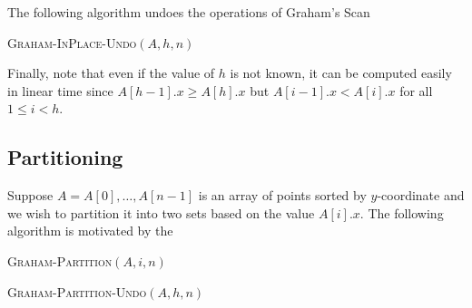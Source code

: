 \documentclass{patmorin}
\begin{document}
The following algorithm undoes the operations of Graham's Scan

\vspace{1ex}
\noindent\begin{minipage}{\textwidth}
\textsc{Graham-InPlace-Undo}$(A, h, n)$
\begin{algorithmic}[1]
  \ENDWHILE
\ENDFOR
\end{algorithmic}
\end{minipage}
\vspace{1ex}
 
Finally, note that even if the value of $h$ is not known, it can be
computed easily in linear time since $A[h-1].x \ge A[h].x$ but
$A[i-1].x<A[i].x$ for all $1\le i< h$.

\subsection{Partitioning}

Suppose $A=A[0],\ldots,A[n-1]$ is an array of points sorted by
$y$-coordinate and we wish to partition it into two sets based on the
value $A[i].x$. The following algorithm is motivated by the 

\vspace{1ex}
\noindent\begin{minipage}{\textwidth}
\textsc{Graham-Partition}$(A, i, n)$
\begin{algorithmic}[1]
  \ENDIF
\ENDFOR
{}
\end{algorithmic}
\end{minipage}
\vspace{1ex}

\vspace{1ex}
\noindent\begin{minipage}{\textwidth}
\textsc{Graham-Partition-Undo}$(A, h, n)$
\begin{algorithmic}[1]
   \ENDIF
\ENDFOR

\end{algorithmic}
\end{minipage}
\vspace{1ex}
\end{document}
